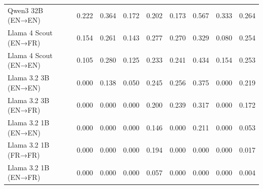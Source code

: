 \begin{tabular}{lcccccccc}
Qwen3 32B (EN→EN) & 0.222 & 0.364 & 0.172 & 0.202 & 0.173 & 0.567 & 0.333 & 0.264 \\
Llama 4 Scout (EN→FR) & 0.154 & 0.261 & 0.143 & 0.277 & 0.270 & 0.329 & 0.080 & 0.254 \\
Llama 4 Scout (EN→EN) & 0.105 & 0.280 & 0.125 & 0.233 & 0.241 & 0.434 & 0.154 & 0.253 \\
Llama 3.2 3B (EN→EN) & 0.000 & 0.138 & 0.050 & 0.245 & 0.256 & 0.375 & 0.000 & 0.219 \\
Llama 3.2 3B (EN→FR) & 0.000 & 0.000 & 0.000 & 0.200 & 0.239 & 0.317 & 0.000 & 0.172 \\
Llama 3.2 1B (EN→EN) & 0.000 & 0.000 & 0.000 & 0.146 & 0.000 & 0.211 & 0.000 & 0.053 \\
Llama 3.2 1B (FR→FR) & 0.000 & 0.000 & 0.000 & 0.194 & 0.000 & 0.000 & 0.000 & 0.017 \\
Llama 3.2 1B (EN→FR) & 0.000 & 0.000 & 0.000 & 0.057 & 0.000 & 0.000 & 0.000 & 0.004 \\
\hline
\end{tabular}
